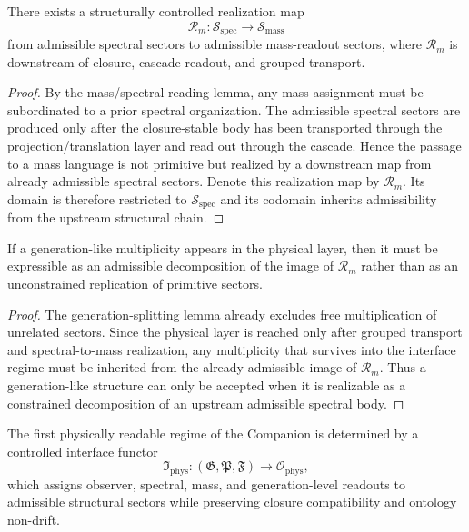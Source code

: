 \begin{proposition}
\label{prop:spectral-to-mass-realization-map}
There exists a structurally controlled realization map
\[
\mathcal R_{m}: \mathcal S_{\mathrm{spec}} \longrightarrow \mathcal S_{\mathrm{mass}}
\]
from admissible spectral sectors to admissible mass-readout sectors, where $\mathcal R_{m}$ is downstream of closure, cascade readout, and grouped transport.
\end{proposition}

\begin{proof}
By the mass/spectral reading lemma, any mass assignment must be subordinated to a prior spectral organization. The admissible spectral sectors are produced only after the closure-stable body has been transported through the projection/translation layer and read out through the cascade. Hence the passage to a mass language is not primitive but realized by a downstream map from already admissible spectral sectors. Denote this realization map by $\mathcal R_m$. Its domain is therefore restricted to $\mathcal S_{\mathrm{spec}}$ and its codomain inherits admissibility from the upstream structural chain.
\end{proof}

\begin{proposition}
\label{prop:generation-compatible-decomposition}
If a generation-like multiplicity appears in the physical layer, then it must be expressible as an admissible decomposition of the image of $\mathcal R_m$ rather than as an unconstrained replication of primitive sectors.
\end{proposition}

\begin{proof}
The generation-splitting lemma already excludes free multiplication of unrelated sectors. Since the physical layer is reached only after grouped transport and spectral-to-mass realization, any multiplicity that survives into the interface regime must be inherited from the already admissible image of $\mathcal R_m$. Thus a generation-like structure can only be accepted when it is realizable as a constrained decomposition of an upstream admissible spectral body.
\end{proof}

\begin{theorem}
\label{thm:controlled-physical-interface-functor}
The first physically readable regime of the Companion is determined by a controlled interface functor
\[
\mathfrak I_{\mathrm{phys}}:
(\mathfrak G,\mathfrak P,\mathfrak F)
\longrightarrow
\mathcal O_{\mathrm{phys}},
\]
which assigns observer, spectral, mass, and generation-level readouts to admissible structural sectors while preserving closure compatibility and ontology non-drift.
\end{theorem}

